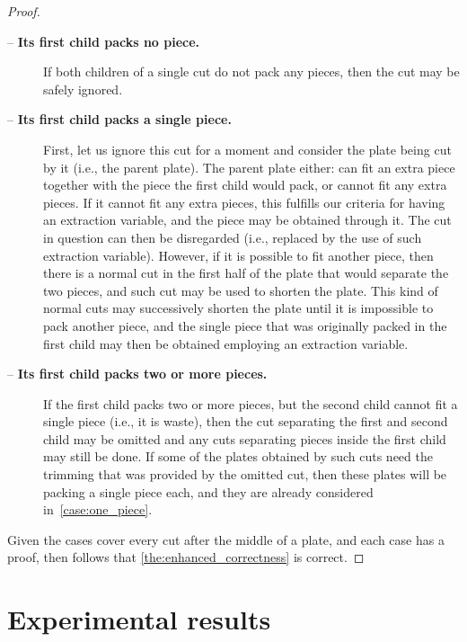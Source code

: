 \documentclass[ppgc,prop-tese,english,formais,babel]{iiufrgs}
\begin{document}
\begin{proof}
\begin{description}
\item[ -- \textbf{Its first child packs no piece.}]
If both children of a single cut do not pack any pieces, then the cut may be safely ignored.
\item[ -- \textbf{Its first child packs a single piece.}]
First, let us ignore this cut for a moment and consider the plate being cut by it (i.e., the parent plate).
The parent plate either: can fit an extra piece together with the piece the first child would pack, or cannot fit any extra pieces.
If it cannot fit any extra pieces, this fulfills our criteria for having an extraction variable, and the piece may be obtained through it.
The cut in question can then be disregarded (i.e., replaced by the use of such extraction variable).
However, if it is possible to fit another piece, then there is a normal cut in the first half of the plate that would separate the two pieces, and such cut may be used to shorten the plate.
This kind of normal cuts may successively shorten the plate until it is impossible to pack another piece, and the single piece that was originally packed in the first child may then be obtained employing an extraction variable.
\item[ -- \textbf{Its first child packs two or more pieces.}]
If the first child packs two or more pieces, but the second child cannot fit a single piece (i.e., it is waste), then the cut separating the first and second child may be omitted and any cuts separating pieces inside the first child may still be done.
If some of the plates obtained by such cuts need the trimming that was provided by the omitted cut, then these plates will be packing a single piece each, and they are already considered in~\cref{case:one_piece}.
\end{description}

Given the cases cover every cut after the middle of a plate, and each case has a proof, then follows that \cref{the:enhanced_correctness} is correct.

\end{proof}

\chapter{Experimental results}
\label{sec:experimental_results}
\end{document}
